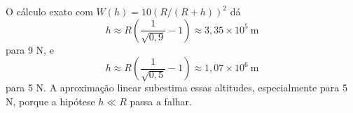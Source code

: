 O cálculo exato com $W(h)=10(R/(R+h))^{2}$ dá
\[
h\approx R\left(\frac{1}{\sqrt{0{,}9}}-1\right)\approx3{,}35\times10^{5}\ \mathrm{m}
\]
para 9 N, e
\[
h\approx R\left(\frac{1}{\sqrt{0{,}5}}-1\right)\approx1{,}07\times10^{6}\ \mathrm{m}
\]
para 5 N. A aproximação linear subestima essas altitudes, especialmente para 5 N, porque a hipótese $h\ll R$ passa a falhar. 